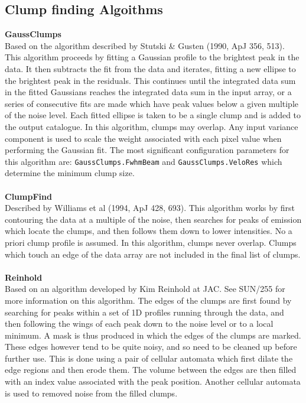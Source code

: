 \documentclass[twoside,11pt]{article}
\newcommand{\xlabel}[1]{}
\renewcommand{\_}{\texttt{\symbol{95}}}
\newcommand{\param}[1]{\texttt{#1}}
\begin{document}
\newpage
\subsection{\xlabel{clumpfind}Clump finding Algoithms}
\label{app:clumpfind}

\textbf{GaussClumps}\\Based on the algorithm described by Stutski \& Gusten (1990, ApJ 356, 513). This algorithm proceeds by fitting a Gaussian profile to the brightest peak in the data. It then subtracts the fit from the data and iterates, fitting a new ellipse to the brightest peak in the residuals. This continues until the integrated data sum in the fitted Gaussians reaches the integrated data sum in the input array, or a series of consecutive fits are made which have peak values below a given multiple of the noise level. Each fitted ellipse is taken to be a single clump and is added to the output catalogue. In this algorithm, clumps may overlap. Any input variance component is used to scale the weight associated with each pixel value when performing the Gaussian fit. The most significant configuration parameters for this algorithm are: \param{GaussClumps.FwhmBeam} and \param{GaussClumps.VeloRes} which determine the minimum clump size.
\\\\
\textbf{ClumpFind}\\
Described by Williams et al (1994, ApJ 428, 693). This algorithm works by first contouring the data at a multiple of the noise, then searches for peaks of emission which locate the clumps, and then follows them down to lower intensities. No a priori clump profile is assumed. In this algorithm, clumps never overlap. Clumps which touch an edge of the data array are not included in the final list of clumps.
\\\\
 \textbf{Reinhold}\\
 Based on an algorithm developed by Kim Reinhold at JAC. See SUN/255 for more information on this algorithm. The edges of the clumps are first found by searching for peaks within a set of 1D profiles running through the data, and then following the wings of each peak down to the noise level or to a local minimum. A mask is thus produced in which the edges of the clumps are marked. These edges however tend to be quite noisy, and so need to be cleaned up before further use. This is done using a pair of cellular automata which first dilate the edge regions and then erode them. The volume between the edges are then filled with an index value associated with the peak position. Another cellular automata is used to removed noise from the filled clumps.
\end{document}
